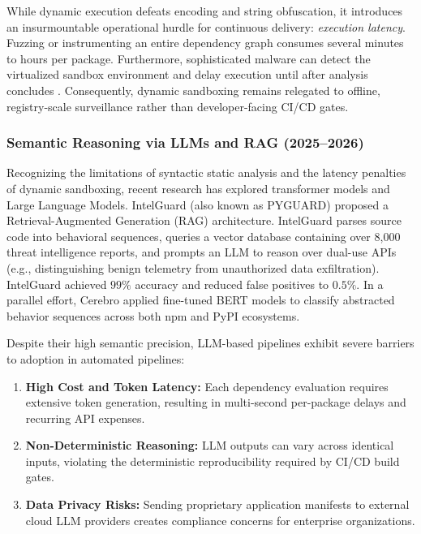While dynamic execution defeats encoding and string obfuscation, it introduces an insurmountable operational hurdle for continuous delivery: \textit{execution latency}. Fuzzing or instrumenting an entire dependency graph consumes several minutes to hours per package. Furthermore, sophisticated malware can detect the virtualized sandbox environment and delay execution until after analysis concludes \cite{ladisa2023sok}. Consequently, dynamic sandboxing remains relegated to offline, registry-scale surveillance rather than developer-facing CI/CD gates.

\subsubsection{Semantic Reasoning via LLMs and RAG (2025--2026)}
Recognizing the limitations of syntactic static analysis and the latency penalties of dynamic sandboxing, recent research has explored transformer models and Large Language Models. IntelGuard (also known as PYGUARD) \cite{guo2026intelguard} proposed a Retrieval-Augmented Generation (RAG) architecture. IntelGuard parses source code into behavioral sequences, queries a vector database containing over 8,000 threat intelligence reports, and prompts an LLM to reason over dual-use APIs (e.g., distinguishing benign telemetry from unauthorized data exfiltration). IntelGuard achieved $99\%$ accuracy and reduced false positives to $0.5\%$. In a parallel effort, Cerebro \cite{zhang2025cerebro} applied fine-tuned BERT models to classify abstracted behavior sequences across both npm and PyPI ecosystems.

Despite their high semantic precision, LLM-based pipelines exhibit severe barriers to adoption in automated pipelines:
\begin{enumerate}
    \item \textbf{High Cost and Token Latency:} Each dependency evaluation requires extensive token generation, resulting in multi-second per-package delays and recurring API expenses.
    \item \textbf{Non-Deterministic Reasoning:} LLM outputs can vary across identical inputs, violating the deterministic reproducibility required by CI/CD build gates.
    \item \textbf{Data Privacy Risks:} Sending proprietary application manifests to external cloud LLM providers creates compliance concerns for enterprise organizations.
\end{enumerate}

